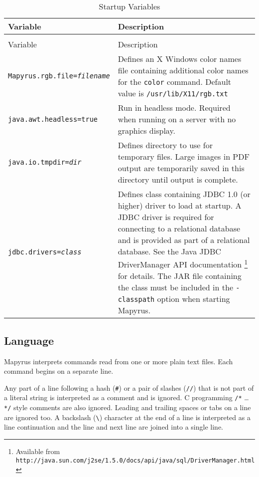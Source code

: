 \begin{longtable}{|l|p{7cm}|}
\hline
\label{startupvariables}
Variable & Description \\
\hline
\hline
\endfirsthead
\hline
\caption{Startup Variables} \\
\endfoot

\hline
Variable & Description \\
\hline
\hline
\endhead

\texttt{Mapyrus.rgb.file=\textit{filename}} &
Defines an X Windows color names file containing additional color names
for the
\texttt{color} command.  Default value is
\texttt{/usr/lib/X11/rgb.txt} \\

\hline

\texttt{java.awt.headless=true} &
Run in headless mode.  Required when running on a server
with no graphics display. \\

\hline

\texttt{java.io.tmpdir=\textit{dir}} &
Defines directory to use for temporary files.  Large images in PDF output
are temporarily saved in this directory until output is complete. \\

\hline

\texttt{jdbc.drivers=\textit{class}} &
Defines class containing JDBC 1.0 (or higher) driver to load at startup.
A JDBC driver is required for connecting to a relational database and
is provided as part of a relational database.
See the Java JDBC DriverManager API documentation
\footnote{Available from \texttt{http://java.sun.com/j2se/1.5.0/docs/api/java/sql/DriverManager.html}}
for details.
The JAR file containing the class must be included in the \texttt{-classpath}
option when starting Mapyrus. \\

\hline
\end{longtable}

\subsection{Language}

Mapyrus interprets commands read from one or more plain text files.
Each command begins on a separate line.

Any part of a line following a hash (\texttt{\#}) or
a pair of slashes (\texttt{//}) that is not part of
a literal string is interpreted as a comment and is ignored.
C programming \texttt{/*} \ldots \texttt{*/} style
comments are also ignored.
Leading and
trailing spaces or tabs on a line are ignored too.  A backslash
(\texttt{\textbackslash}) character at the end of a line is interpreted as a
line continuation and the line and next line are joined into a single line.

